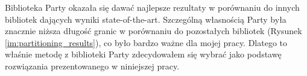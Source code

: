 Biblioteka Party \cite{1364754} okazała się dawać najlepsze rezultaty w porównaniu do innych bibliotek dających wyniki
state-of-the-art. Szczególną własnością Party była znacznie niższa długość granic w porównaniu do pozostałych bibliotek
(Rysunek \ref{im:partitioning_results}), co było bardzo ważne dla mojej pracy. Dlatego to właśnie metodę z biblioteki
Party zdecydowałem się wybrać jako podstawę rozwiązania prezentowanego w niniejszej pracy.